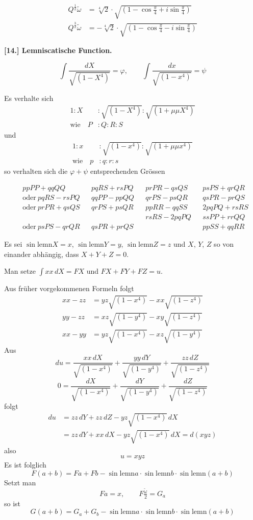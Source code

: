 \documentclass[10pt,a4paper]{article}
\newcommand{\lemn}{\text{lemn}}
\newcommand{\sinlemn}{\sin\lemn}
\begin{document}
\begin{align*}
Q^{\frac12}\tilde{\omega} &= \sqrt[4]{2}\cdot\sqrt{(1-\cos\tfrac{\pi}{4}+i\sin\tfrac{\pi}{4})}\\
Q^{\frac32}\tilde{\omega} &= -\sqrt[4]{2}\cdot\sqrt{(1-\cos\tfrac{\pi}{4}-i\sin\tfrac{\pi}{4})}
\end{align*}

\medskip
\noindent\textbf{[14.] Lemniscatische Function.}

\[
\int\!\frac{dX}{\sqrt{(1-X^4)}} = \varphi, \qquad
\int\!\frac{dx}{\sqrt{(1-x^4)}} = \psi
\]

Es verhalte sich
\begin{align*}
1 : X &: \sqrt{(1-X^4)} : \sqrt{(1+\mu\mu X^4)}\\
\text{wie}\quad P &: Q : R : S
\end{align*}
und
\begin{align*}
1 : x &: \sqrt{(1-x^4)} : \sqrt{(1+\mu\mu x^4)}\\
\text{wie}\quad p &: q : r : s
\end{align*}
so verhalten sich die $\varphi+\psi$ entsprechenden Grössen

\begin{align*}
&ppPP+qqQQ && pqRS+rsPQ && prPR-qsQS && psPS+qrQR\\
&\text{oder}\ pqRS-rsPQ && qqPP-ppQQ && qrPS-psQR && qsPR-prQS\\
&\text{oder}\ prPR+qsQS && qrPS+psQR && ppRR-qqSS && 2pqPQ+rsRS\\
& && && rsRS-2pqPQ && ssPP+rrQQ\\
&\text{oder}\ psPS-qrQR && qsPR+prQS && && ppSS+qqRR
\end{align*}

Es sei $\sinlemn X = x$, $\sinlemn Y = y$, $\sinlemn Z = z$
und $X$, $Y$, $Z$ so von einander abhängig, dass $X+Y+Z=0$.

Man setze $\int\!xx\,dX = FX$ und $FX+FY+FZ = u$.

Aus früher vorgekommenen Formeln folgt
\begin{align*}
xx-zz &= yz\sqrt{(1-x^4)} - xx\sqrt{(1-z^4)}\\
yy-zz &= xz\sqrt{(1-y^4)} - xy\sqrt{(1-z^4)}\\
xx-yy &= yz\sqrt{(1-x^4)} - xz\sqrt{(1-y^4)}
\end{align*}
Aus
\[
du = \frac{xx\,dX}{\sqrt{(1-x^4)}} + \frac{yy\,dY}{\sqrt{(1-y^4)}} + \frac{zz\,dZ}{\sqrt{(1-z^4)}}
\]
\[
0 = \frac{dX}{\sqrt{(1-x^4)}} + \frac{dY}{\sqrt{(1-y^4)}} + \frac{dZ}{\sqrt{(1-z^4)}}
\]
folgt
\begin{align*}
du &= zz\,dY + zz\,dZ - yz\sqrt{(1-x^4)}\,dX\\
&= zz\,dY + xx\,dX - yz\sqrt{(1-x^4)}\,dX = d(xyz)
\end{align*}
also
\[
u = xyz
\]
Es ist folglich
\[
F(a+b) = Fa + Fb - \sinlemn a \cdot \sinlemn b \cdot \sinlemn(a+b)
\]
Setzt man
\[
Fa = x, \qquad F\tfrac{\tilde{\omega}}{2} = G_a
\]
so ist
\[
G(a+b) = G_a + G_b - \sinlemn a \cdot \sinlemn b \cdot \sinlemn(a+b)
\]
\end{document}
